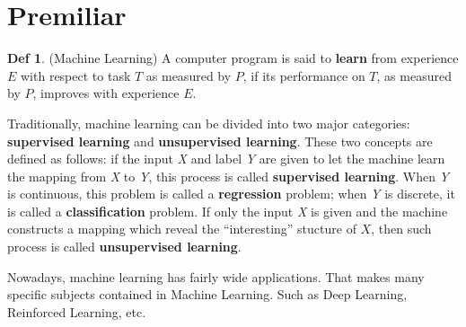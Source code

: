 \documentclass{book}
\begin{document}
\theoremstyle{definition} 
\newtheorem{define}{Def}[section]

\theoremstyle{plain} 
\newtheorem{thm}{Theorem}[section] \newtheorem{lema}{Lemma}[chapter] \newtheorem{cor}{Corollary}[chapter]
\newtheorem{prop}{Property}[chapter] \newtheorem{fact}{Fact}[chapter] 


\mainmatter

\chapter*{Premiliar}

\begin{define}(Machine Learning)
    A computer program is said to \textbf{learn} from experience $E$ with respect to task $T$ as measured by $P$, if its performance on $T$,
    as measured by $P$, improves with experience $E$.
\end{define}

\par
Traditionally, machine learning can be divided into two major categories: \textbf{supervised learning} and \textbf{unsupervised learning}. These two concepts are defined as follows:
if the input \textit{X} and label \textit{Y} are given to let the machine learn the mapping from \textit{X} to \textit{Y}, this process is called \textbf{supervised learning}. When
\textit{Y} is continuous, this problem is called a \textbf{regression} problem; when \textit{Y} is discrete, it is called a \textbf{classification} problem. If only the input \textit{X}
is given and the machine constructs a mapping which reveal the ``interesting'' stucture of $X$, then such process is called \textbf{unsupervised learning}.

Nowadays, machine learning has fairly wide applications. That makes many specific subjects contained in Machine Learning. Such as Deep Learning, Reinforced Learning, etc.


\end{document}
